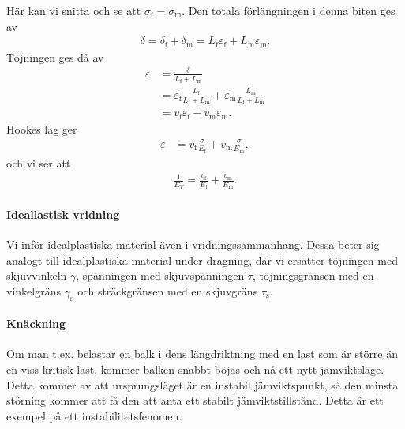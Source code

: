 Här kan vi snitta och se att $\sigma_{\text{f}} = \sigma_{\text{m}}$. Den totala förlängningen i denna biten ges av
\begin{align*}
	\delta = \delta_{\text{f}} + \delta_{\text{m}} = L_{\text{f}}\varepsilon_{\text{f}} + L_{\text{m}}\varepsilon_{\text{m}}.
\end{align*}
Töjningen ges då av
\begin{align*}
	\varepsilon &= \frac{\delta}{L_{\text{f}} + L_{\text{m}}} \\
	            &= \varepsilon_{\text{f}}\frac{L_{\text{f}}}{L_{\text{f}} + L_{\text{m}}} + \varepsilon_{\text{m}}\frac{L_{\text{m}}}{L_{\text{f}} + L_{\text{m}}} \\
	            &= v_{\text{f}}\varepsilon_{\text{f}} + v_{\text{m}}\varepsilon_{\text{m}}.
\end{align*}
Hookes lag ger
\begin{align*}
	\varepsilon &= v_{\text{f}}\frac{\sigma}{E_{\text{f}}} + v_{\text{m}}\frac{\sigma}{E_{\text{m}}},
\end{align*}
och vi ser att
\begin{align*}
	\frac{1}{E_{T}} = \frac{v_{\text{f}}}{E_{\text{f}}} + \frac{v_{\text{m}}}{E_{\text{m}}}.
\end{align*}

\paragraph{Ideallastisk vridning}
Vi inför idealplastiska material även i vridningssammanhang. Dessa beter sig analogt till idealplastiska material under dragning, där vi ersätter töjningen med skjuvvinkeln $\gamma$, spänningen med skjuvspänningen $\tau$, töjningsgränsen med en vinkelgräns $\gamma_{\text{s}}$ och sträckgränsen med en skjuvgräns $\tau_{\text{s}}$.

\paragraph{Knäckning}
Om man t.ex. belastar en balk i dens längdriktning med en last som är större än en viss kritisk last, kommer balken snabbt böjas och nå ett nytt jämviktsläge. Detta kommer av att ursprungsläget är en instabil jämviktspunkt, så den minsta störning kommer att få den att anta ett stabilt jämviktstillstånd. Detta är ett exempel på ett instabilitetsfenomen.